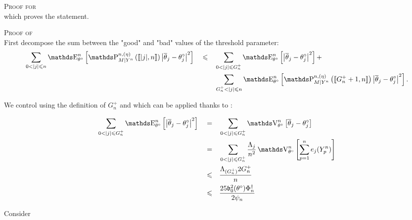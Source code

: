 \begin{pro}{\textsc{Proof for } \\}
which proves the statement.

\qedsymbol
\end{pro}

\begin{pro}{\textsc{Proof of } \\}\label{PROD.5.2}
First decompose the sum between the "good" and "bad" values of the threshold parameter:
\begin{alignat}{3}
& \sum\limits_{0 < \vert j \vert \leq n} \E_{\theta^{\circ}}^{n}\left[\P_{M \vert Y^{n}}^{n, (\eta)} \left(\llbracket \vert j \vert, n \rrbracket \right) \left\vert  \overline{\theta}_{j} - \theta^{\circ}_{j} \right\vert^{2}\right] && \leq && \sum\limits_{0 < \vert j \vert \leq G^{+}_{n}} \E_{\theta^{\circ}}^{n}\left[\left\vert \overline{\theta}_{j} - \theta^{\circ}_{j}\right\vert^{2} \right] +\label{EQD.28}\\
& && && \sum\limits_{G^{+}_{n} < \vert j \vert \leq n} \E_{\theta^{\circ}}^{n}\left[\P_{M \vert Y^{n}}^{n, (\eta)}\left(\llbracket G^{+}_{n} + 1, n\rrbracket\right) \left\vert \overline{\theta}_{j} - \theta^{\circ}_{j}\right\vert^{2} \right]\label{EQD.29}.
\end{alignat}

We control  using the definition of $G^{+}_{n}$ and  which can be applied thanks to :

\begin{alignat*}{3}
& \sum\limits_{0 < \vert j \vert \leq G^{+}_{n}} \E_{\theta^{\circ}}^{n}\left[\left\vert \overline{\theta}_{j} - \theta^{\circ}_{j}\right\vert^{2} \right] && = && \sum\limits_{0 < \vert j \vert \leq G^{+}_{n}} \V_{\theta^{\circ}}^{n}\left[ \overline{\theta}_{j} - \theta^{\circ}_{j} \right]\\
& && = && \sum\limits_{0 < \vert j \vert \leq G^{+}_{n}} \frac{\Lambda_{j}}{n^{2}} \V_{\theta^{\circ}}^{n}\left[ \sum\limits_{p = 1}^{n} e_{j}(Y_{p}^{n})\right]\\
& && \leq && \frac{\Lambda_{(G^{+}_{n})}2 G^{+}_{n}}{n}\\
& && \leq && \frac{25 \mathfrak{b}_{0}^{2}(\theta^{\circ}) \Phi^{\dagger}_{n}}{2 \psi_{n}}\\
\end{alignat*}

Consider 


\end{pro}
